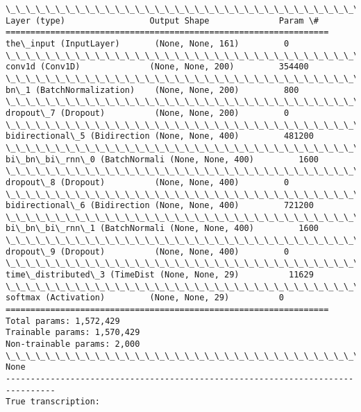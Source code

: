 \documentclass[11pt]{article}
\begin{document}
    \begin{Verbatim}[commandchars=\\\{\}]
\_\_\_\_\_\_\_\_\_\_\_\_\_\_\_\_\_\_\_\_\_\_\_\_\_\_\_\_\_\_\_\_\_\_\_\_\_\_\_\_\_\_\_\_\_\_\_\_\_\_\_\_\_\_\_\_\_\_\_\_\_\_\_\_\_
Layer (type)                 Output Shape              Param \#   
=================================================================
the\_input (InputLayer)       (None, None, 161)         0         
\_\_\_\_\_\_\_\_\_\_\_\_\_\_\_\_\_\_\_\_\_\_\_\_\_\_\_\_\_\_\_\_\_\_\_\_\_\_\_\_\_\_\_\_\_\_\_\_\_\_\_\_\_\_\_\_\_\_\_\_\_\_\_\_\_
conv1d (Conv1D)              (None, None, 200)         354400    
\_\_\_\_\_\_\_\_\_\_\_\_\_\_\_\_\_\_\_\_\_\_\_\_\_\_\_\_\_\_\_\_\_\_\_\_\_\_\_\_\_\_\_\_\_\_\_\_\_\_\_\_\_\_\_\_\_\_\_\_\_\_\_\_\_
bn\_1 (BatchNormalization)    (None, None, 200)         800       
\_\_\_\_\_\_\_\_\_\_\_\_\_\_\_\_\_\_\_\_\_\_\_\_\_\_\_\_\_\_\_\_\_\_\_\_\_\_\_\_\_\_\_\_\_\_\_\_\_\_\_\_\_\_\_\_\_\_\_\_\_\_\_\_\_
dropout\_7 (Dropout)          (None, None, 200)         0         
\_\_\_\_\_\_\_\_\_\_\_\_\_\_\_\_\_\_\_\_\_\_\_\_\_\_\_\_\_\_\_\_\_\_\_\_\_\_\_\_\_\_\_\_\_\_\_\_\_\_\_\_\_\_\_\_\_\_\_\_\_\_\_\_\_
bidirectional\_5 (Bidirection (None, None, 400)         481200    
\_\_\_\_\_\_\_\_\_\_\_\_\_\_\_\_\_\_\_\_\_\_\_\_\_\_\_\_\_\_\_\_\_\_\_\_\_\_\_\_\_\_\_\_\_\_\_\_\_\_\_\_\_\_\_\_\_\_\_\_\_\_\_\_\_
bi\_bn\_bi\_rnn\_0 (BatchNormali (None, None, 400)         1600      
\_\_\_\_\_\_\_\_\_\_\_\_\_\_\_\_\_\_\_\_\_\_\_\_\_\_\_\_\_\_\_\_\_\_\_\_\_\_\_\_\_\_\_\_\_\_\_\_\_\_\_\_\_\_\_\_\_\_\_\_\_\_\_\_\_
dropout\_8 (Dropout)          (None, None, 400)         0         
\_\_\_\_\_\_\_\_\_\_\_\_\_\_\_\_\_\_\_\_\_\_\_\_\_\_\_\_\_\_\_\_\_\_\_\_\_\_\_\_\_\_\_\_\_\_\_\_\_\_\_\_\_\_\_\_\_\_\_\_\_\_\_\_\_
bidirectional\_6 (Bidirection (None, None, 400)         721200    
\_\_\_\_\_\_\_\_\_\_\_\_\_\_\_\_\_\_\_\_\_\_\_\_\_\_\_\_\_\_\_\_\_\_\_\_\_\_\_\_\_\_\_\_\_\_\_\_\_\_\_\_\_\_\_\_\_\_\_\_\_\_\_\_\_
bi\_bn\_bi\_rnn\_1 (BatchNormali (None, None, 400)         1600      
\_\_\_\_\_\_\_\_\_\_\_\_\_\_\_\_\_\_\_\_\_\_\_\_\_\_\_\_\_\_\_\_\_\_\_\_\_\_\_\_\_\_\_\_\_\_\_\_\_\_\_\_\_\_\_\_\_\_\_\_\_\_\_\_\_
dropout\_9 (Dropout)          (None, None, 400)         0         
\_\_\_\_\_\_\_\_\_\_\_\_\_\_\_\_\_\_\_\_\_\_\_\_\_\_\_\_\_\_\_\_\_\_\_\_\_\_\_\_\_\_\_\_\_\_\_\_\_\_\_\_\_\_\_\_\_\_\_\_\_\_\_\_\_
time\_distributed\_3 (TimeDist (None, None, 29)          11629     
\_\_\_\_\_\_\_\_\_\_\_\_\_\_\_\_\_\_\_\_\_\_\_\_\_\_\_\_\_\_\_\_\_\_\_\_\_\_\_\_\_\_\_\_\_\_\_\_\_\_\_\_\_\_\_\_\_\_\_\_\_\_\_\_\_
softmax (Activation)         (None, None, 29)          0         
=================================================================
Total params: 1,572,429
Trainable params: 1,570,429
Non-trainable params: 2,000
\_\_\_\_\_\_\_\_\_\_\_\_\_\_\_\_\_\_\_\_\_\_\_\_\_\_\_\_\_\_\_\_\_\_\_\_\_\_\_\_\_\_\_\_\_\_\_\_\_\_\_\_\_\_\_\_\_\_\_\_\_\_\_\_\_
None
--------------------------------------------------------------------------------
True transcription:


\end{Verbatim}
\end{document}
